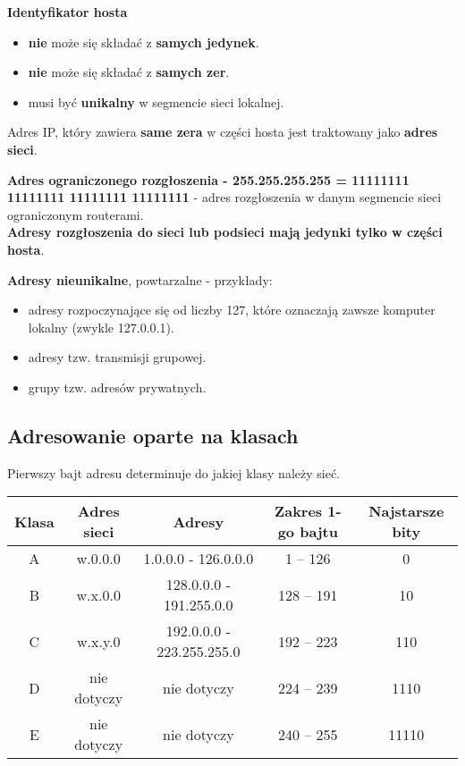 \documentclass[a4paper]{article}
\begin{document}
\textbf{Identyfikator hosta}
\begin{itemize}
    \item \textbf{nie} może się składać z \textbf{samych jedynek}.
    \item \textbf{nie} może się składać z \textbf{samych zer}.
    \item musi być \textbf{unikalny} w segmencie sieci lokalnej.
\end{itemize}

Adres IP, który zawiera \textbf{same zera} w części hosta jest traktowany jako \textbf{adres sieci}.

\textbf{Adres ograniczonego rozgłoszenia - 255.255.255.255 = 11111111 11111111 11111111 11111111} -  adres rozgłoszenia
w danym segmencie sieci ograniczonym routerami.\\
\textbf{Adresy rozgłoszenia do sieci lub podsieci mają jedynki tylko w części hosta}.

\textbf{Adresy nieunikalne}, powtarzalne - przykłady:
\begin{itemize}
    \item adresy rozpoczynające się od liczby 127, które oznaczają zawsze komputer lokalny (zwykle 127.0.0.1).
    \item adresy tzw. transmisji grupowej.
    \item grupy tzw. adresów prywatnych.
\end{itemize}

\subsection{Adresowanie oparte na klasach}

Pierwszy bajt adresu determinuje do jakiej klasy należy sieć.

\begin{tabular}{|c|c|c|c|c|}
\hline
Klasa & Adres sieci & Adresy & Zakres 1-go bajtu & Najstarsze bity\\
\hline
A & w.0.0.0 & 1.0.0.0 - 126.0.0.0 & 1 – 126 & 0\\
\hline
B & w.x.0.0 & 128.0.0.0 - 191.255.0.0 & 128 – 191 & 10\\
\hline
C & w.x.y.0 & 192.0.0.0 - 223.255.255.0 & 192 – 223 & 110\\
\hline
D & nie dotyczy & nie dotyczy & 224 – 239 & 1110\\
\hline
E & nie dotyczy & nie dotyczy & 240 – 255 & 11110\\
\hline
\end{tabular}
\end{document}
